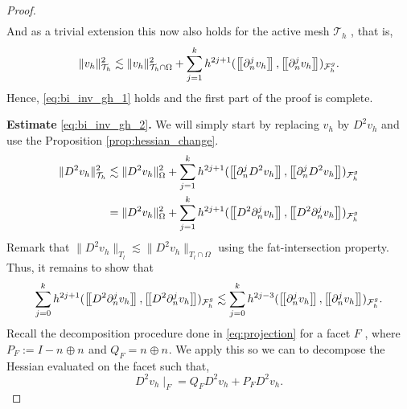 \begin{proof}
\begin{align}
            \end{align}
        And as a trivial extension this now also holds for the active mesh $\mathcal{T} _{h}$ , that is,
        \begin{equation}
                    \| v_{h} \|_{ \mathcal{T} _{h } }^{2  } \lesssim  \| v_{h} \|_{ \mathcal{T}_{h } \cap \Omega   }^{ 2 }  + \sum_{j=1}^{k} h^{2j+1} ( \left[\!\left[  \partial ^{j}_{n} v_{h}  \right]\!\right], \left[\!\left[  \partial ^{j}_{n}v_{h}  \right]\!\right]    )_{\mathcal{F}_{h}^{g}}.
        \end{equation}
        Hence, \eqref{eq:bi_inv_gh_1} holds and the first part of the proof is complete.

        \textbf{Estimate} \eqref{eq:bi_inv_gh_2}\textbf{.}  We will simply start by replacing $v_{h}$ by $D^2 v_{h}$ and use the Proposition \ref{prop:hessian_change}.
        \begin{align}
                    \| D^2 v_{h} \|_{ \mathcal{T} _{h} }^{2  }&  \lesssim \| D^2 v_{h} \|_{ \Omega  }^{ 2 }  + \sum_{j=1}^{k} h^{2j+1} ( \jump{   \partial ^{j}_{n} D^2 v_{h} }, \jump{  \partial ^{j}_{n} D^2 v_{h}}    )_{\mathcal{F}_{h}^{g}} \\
                    &=  \| D^2 v_{h} \|_{ \Omega  }^{ 2 }  + \sum_{j=1}^{k} h^{2j+1} ( \jump{   D^2 \partial ^{j}_{n}  v_{h} }, \jump{  D^2 \partial ^{j}_{n}  v_{h}}    )_{\mathcal{F}_{h}^{g}}
        \end{align}
        Remark that $\|  D^2 v_{h} \|_{ T_{l} }^{  } \lesssim  \|  D^2 v_{h} \|_{ T_{l} \cap \Omega  }^{  }  $ using the fat-intersection property.
        Thus, it remains to show that
        \begin{equation}
        \sum_{j=0}^{k} h^{2j+1} ( \jump{   D^2 \partial ^{j}_{n}  v_{h} }, \jump{  D^2 \partial ^{j}_{n}  v_{h}}    )_{\mathcal{F}_{h}^{g}} \lesssim  \sum_{j=0}^{k} h^{2j-3} ( \jump{    \partial ^{j}_{n}  v_{h} }, \jump{  \partial ^{j}_{n}  v_{h}}
        )_{\mathcal{F}_{h}^{g}}.
        \end{equation}
        Recall the decomposition procedure done in \eqref{eq:projection} for a facet $F$ , where $P_{F} := I - n_{} \oplus n_{} $ and $Q_{F} = n_{} \oplus n_{}$. We apply this so we can to decompose the Hessian evaluated on the facet  such that,
        \begin{equation}
        D^2 v_{h}  \mid _{F} = Q_{F}D^2v_{h} + P_{F} D^2 v_{h} .
        \end{equation}

\end{proof}
